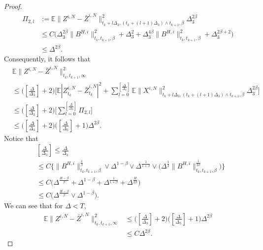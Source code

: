 \documentclass[10pt,a4paper]{amsart}
\def\E{\mathbb E}
\begin{document}
\begin{proof}
\begin{align*}
	\Pi_{2,l}&:=\E\|Z^{i,N}-\bar{Z}^{i,N}\|^2_{t_k+l\Delta_3,(t_k+(l+1)\Delta_3)\wedge t_{k+1},\beta}\Delta_3^{2\beta}\\
	&\leq C\Big(\Delta_3^{2\beta}\|B^{H,i}\|^2_{t_k,t_{k+1},\beta}+\Delta_3^{2}+\Delta_3^{4\beta}\|B^{H,i}\|^2_{t_k,t_{k+1},\beta}+\Delta_3^{2\beta+2}\Big)\\
	&\leq \Delta^{2\beta}.
\end{align*}
Consequently, it follows that
	\begin{equation}
	\begin{aligned}
		&\E\|Z^{i,N}-\bar Z^{i,N}\|^2_{t_k,t_{k+1},\infty}\\
		&\leq
		\big([\frac{\Delta}{\Delta_3}]+2 \big) \Big[\E|Z^{i,N}_{t_k}-\bar{Z}^{i,N}_{t_k}|^2+\sum_{l=0}^{[\frac{\Delta}{\Delta_3}]}\E\|X^{i,N}\|^2_{t_k+l\Delta_3,(t_k+(l+1)\Delta_3)\wedge t_{k+1},\beta}\Delta_3^{2\beta}\Big]\\
		&\leq \big([\frac{\Delta}{\Delta_3}]+2 \big)
		\Big[\sum_{l=0}^{[\frac{\Delta}{\Delta_3}]}\Pi_{2,l}\Big]\\
		&\leq \big([\frac{\Delta}{\Delta_3}]+2 \big)\big([\frac{\Delta}{\Delta_3}]+1 \big)\Delta^{2\beta}.
	\end{aligned}
\end{equation}
Notice that
\begin{equation}
	\begin{aligned}
		&[\frac{\Delta}{\Delta_3}]\leq \frac{\Delta}{\Delta_3}\\
		&\leq C\Bigg\{\Big\|B^{H,i}\|^{\frac{1}{\beta}}_{t_k,t_{k+1},\beta}\vee \Delta^{1-\beta}
		\vee  \Delta^{\frac{1}{1+\beta}}\vee \Big( \Delta^{\frac{1}{2}}\|B^{H,i}\|^{\frac{1}{2\beta}}_{t_k,t_{k+1},\beta}\Big)\Bigg\}\\
		&\leq  C\Bigg(\Delta^{\frac{H-\beta}{\beta}}+  \Delta^{1-\beta}+  \Delta^{\frac{1}{1+\beta}}+  \Delta^{\frac{H}{2\beta}}\Bigg)\\
		&\leq C\Big(\Delta^{\frac{H-\beta}{\beta}}\vee \Delta^{1-\beta}\Big).
	\end{aligned}
\end{equation}
We can see that for $\Delta<T$,
\begin{equation}
	\begin{aligned}
			\E\|Z^{i,N}-\bar Z^{i,N}\|^2_{t_k,t_{k+1},\infty}&\leq \big([\frac{\Delta}{\Delta_3}]+2 \big)\big([\frac{\Delta}{\Delta_3}]+1 \big)\Delta^{2\beta}\\
			&\leq C\Delta^{2\beta}.
	\end{aligned}
\end{equation}

\end{proof}
\end{document}
